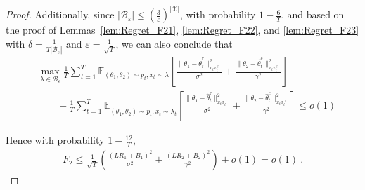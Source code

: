 \documentclass[10pt,a4paper]{amsart}
\begin{document}
\begin{proof}
Additionally, since \( |\mathcal{B}_\varepsilon| \le \left( \frac{3}{\varepsilon} \right)^{|\mathcal{X}|} \), with probability \( 1 - \frac{6}{T} \), and based on the proof of Lemmas~\ref{lem:Regret_F21}, \ref{lem:Regret_F22}, and \ref{lem:Regret_F23} with \( \delta = \frac{1}{T|\mathcal{B}_\varepsilon|} \) and \( \varepsilon = \frac{1}{\sqrt{T}} \), we can also conclude that
\begin{align*}
&\max_{\lambda \in \mathcal{B}_\varepsilon} \frac{1}{T} \sum_{t=1}^{T} \mathbb{E}_{(\theta_1, \theta_2) \sim p_t, x_t \sim \lambda} \left[ \frac{\|\theta_1 - \hat{\theta}_t^{\mathrm{r}}\|_{x_t x_t^\top}^2}{\sigma^2} + \frac{\|\theta_2 - \hat{\theta}_t^{\mathrm{c}}\|_{x_t x_t^\top}^2}{\gamma^2} \right] \\
&\qquad- \frac{1}{T} \sum_{t=1}^{T} \mathbb{E}_{(\theta_1, \theta_2) \sim p_t, x_t \sim \tilde{\lambda}_t} \left[ \frac{\|\theta_1 - \hat{\theta}_t^{\mathrm{r}}\|_{x_t x_t^\top}^2}{\sigma^2} + \frac{\|\theta_2 - \hat{\theta}_t^{\mathrm{c}}\|_{x_t x_t^\top}^2}{\gamma^2} \right]
\le o(1)
\end{align*}

Hence with probability $1-\frac{12}{T}$,
\begin{align*}
    F_2\le \frac{1}{\sqrt{T}}\left(\frac{(LR_1+B_1)^2}{\sigma^2}+\frac{(LR_2+B_2)^2}{\gamma^2}\right)+o(1)
    =o(1)~.
\end{align*}



\end{proof}
\end{document}
